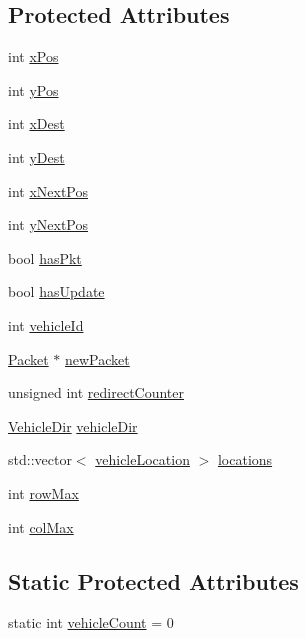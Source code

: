 \subsection*{Protected Attributes}
\begin{DoxyCompactItemize}
\item 
int \hyperlink{class_vehicle_a7cac04ea465e15affd92fe489efea1d1}{x\+Pos}
\item 
int \hyperlink{class_vehicle_a7525979f84d06b888d15200ad42f1ef2}{y\+Pos}
\item 
int \hyperlink{class_vehicle_a508dd8d01cbc3567417d6054bae560f0}{x\+Dest}
\item 
int \hyperlink{class_vehicle_acddc414f0c2f5c40d54462fb4ac44d7d}{y\+Dest}
\item 
int \hyperlink{class_vehicle_a11f830ab6e4543d535ceef79c590298c}{x\+Next\+Pos}
\item 
int \hyperlink{class_vehicle_a51e06932f2d09761aa78a98d6d999588}{y\+Next\+Pos}
\item 
bool \hyperlink{class_vehicle_a1d5bd3f458b1c11f0034320e8be4ae32}{has\+Pkt}
\item 
bool \hyperlink{class_vehicle_a8356764cc782f2b5dc203fb647b9d56a}{has\+Update}
\item 
int \hyperlink{class_vehicle_aacd2af1c441b2820c7b8298efab443a6}{vehicle\+Id}
\item 
\hyperlink{struct_packet}{Packet} $\ast$ \hyperlink{class_vehicle_a980fe4f1b97097b24c28dba4909854bc}{new\+Packet}
\item 
unsigned int \hyperlink{class_vehicle_afcbba425ca9dbca9c29e79e21f9f64fc}{redirect\+Counter}
\item 
\hyperlink{vehicle_8h_ab81942edaa6e6c3f12551c3d0e511b85}{Vehicle\+Dir} \hyperlink{class_vehicle_a363fe00a8ef2dc453545f97acd601b14}{vehicle\+Dir}
\item 
std\+::vector$<$ \hyperlink{structvehicle_location}{vehicle\+Location} $>$ \hyperlink{class_vehicle_afac76350900a93121a936df50e550da2}{locations}
\item 
int \hyperlink{class_vehicle_a9c3dce0e6d67ba8f703cfd0ff10cb6ac}{row\+Max}
\item 
int \hyperlink{class_vehicle_a8364facc67825674d98b0fd8daf2ebee}{col\+Max}
\end{DoxyCompactItemize}
\subsection*{Static Protected Attributes}
\begin{DoxyCompactItemize}
\item 
static int \hyperlink{class_vehicle_ae139b67e1e1fcd510283f2a7aa358686}{vehicle\+Count} = 0
\end{DoxyCompactItemize}


